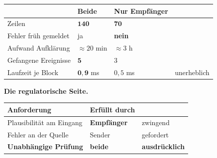 \begin{merksatz}
\begin{center}
{\small
\renewcommand{\arraystretch}{1.45}
\begin{tabular}{@{}P{2.8cm}P{2.2cm}P{2.4cm}P{1.8cm}@{}}
\toprule
& \textbf{Beide} & \textbf{Nur Empfänger} & \\
\midrule
Zeilen & $\mathbf{140}$ & $\mathbf{70}$ & \\
Fehler früh gemeldet & \textcolor{gruen}{ja} & \textcolor{akzent}{\textbf{nein}} & \\
Aufwand Aufklärung & $\approx20$ min & \textcolor{akzent}{$\approx3$ h} & \\
Gefangene Ereignisse & $\mathbf{5}$ & $3$ & \\
Laufzeit je Block & $\mathbf{0{,}9}$ ms & $0{,}5$ ms & \textcolor{gruen}{unerheblich}\\
\bottomrule
\end{tabular}}
\end{center}

\begin{center}
\begin{minipage}{0.88\textwidth}
\end{minipage}
\end{center}

\textbf{Die regulatorische Seite.}

\begin{center}
\renewcommand{\arraystretch}{1.45}
\begin{tabular}{@{}P{3.0cm}P{2.2cm}P{2.6cm}@{}}
\toprule
\textbf{Anforderung} & \textbf{Erfüllt durch} & \\
\midrule
Plausibilität am Eingang & \textbf{Empfänger} & \textcolor{gruen}{zwingend}\\
Fehler an der Quelle & Sender & \textcolor{gruen}{gefordert}\\
\textbf{Unabhängige Prüfung} & \textbf{beide} & \textcolor{gruen}{\textbf{ausdrücklich}}\\
\bottomrule
\end{tabular}
\end{center}

\begin{center}
\end{center}
\end{merksatz}

